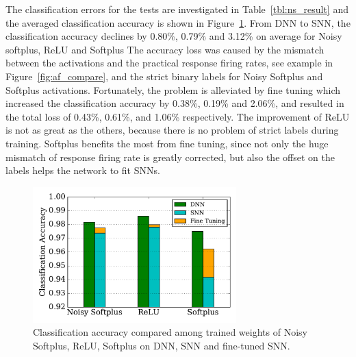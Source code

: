 \documentclass[runningheads,a4paper]{llncs}
\begin{document}
The classification errors for the tests are investigated in Table~\ref{tbl:ns_result} and the averaged classification accuracy is shown in Figure~\ref{Fig:result_bar}.
From DNN to SNN, the classification accuracy declines by 0.80\%, 0.79\% and 3.12\% on average for Noisy softplus, ReLU and Softplus
The accuracy loss was caused by the mismatch between the activations and the practical response firing rates, see example in Figure~\ref{fig:af_compare}, and the strict binary labels for Noisy Softplus and Softplus activations.
Fortunately, the problem is alleviated by fine tuning which increased the classification accuracy by 0.38\%, 0.19\% and 2.06\%, and resulted in the total loss of 0.43\%, 0.61\%, and 1.06\% respectively.
The improvement of ReLU is not as great as the others, because there is no problem of strict labels during training.
Softplus benefits the most from fine tuning, since not only the huge mismatch of response firing rate is greatly corrected, but also the offset on the labels helps the network to fit SNNs. 

\begin{figure}[hbt!]
	\centering
	\includegraphics[width=0.7\textwidth]{9-2.pdf}
	\caption{Classification accuracy compared among trained weights of Noisy Softplus, ReLU, Softplus on DNN, SNN and fine-tuned SNN.}
	\label{Fig:result_bar}
\end{figure}
\end{document}
